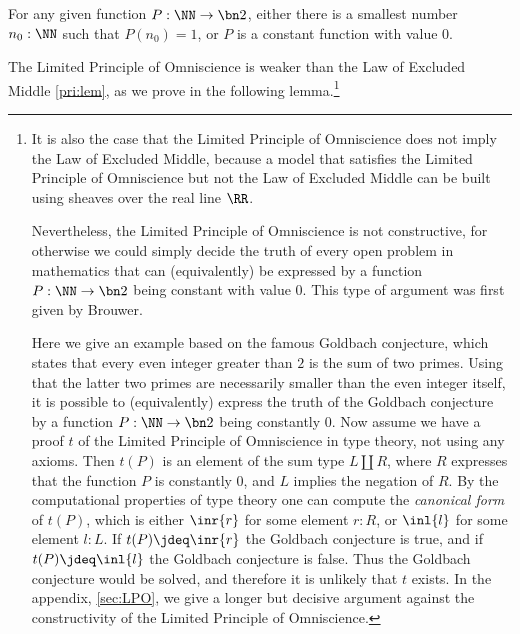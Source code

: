 \begin{principle}
  \label{LPO}%
  For any given function $P:\NN\to\bn 2$,
  either there is a smallest number $n_0:\NN$ such that $P(n_0)=1$,
  or $P$ is a constant function with value $0$.
\end{principle}


The Limited Principle of Omniscience is weaker than the Law of Excluded Middle \cref{pri:lem}, as we prove in the following lemma.\footnote{%
  It is also the case that the Limited Principle of Omniscience does not imply the Law of Excluded Middle, because
  a model that satisfies the Limited Principle of Omniscience but not the Law of Excluded Middle can be built using sheaves over the real line $\RR$.

  Nevertheless, the Limited Principle of Omniscience is not constructive,
  for otherwise we could simply decide the truth of every open problem in mathematics
  that can (equivalently) be expressed by a function $P:\NN\to\bn 2$ being constant with value $0$.
  This type of argument was first given by Brouwer. %

  Here we give an example based on the famous Goldbach conjecture,
  which states that every even integer greater than $2$ is the sum of two primes. Using that
  the latter two primes are necessarily smaller than the even integer itself, it is possible
  to (equivalently) express the truth of the Goldbach conjecture by a function $P:\NN\to\bn 2$
  being constantly $0$. Now assume we have a proof $t$ of the Limited Principle of Omniscience
  in type theory, not using any axioms. Then $t(P)$ is an element of the
  sum type $L\amalg R$, where $R$ expresses that the function $P$ is constantly $0$,
  and $L$ implies the negation of $R$.
  By the computational properties of type theory one can compute the
  \emph{canonical form} of $t(P)$, which is either $\inr{r}$ for some element $r:R$,
  or $\inl{l}$ for some element $l:L$. If $t(P)\jdeq\inr{r}$ the Goldbach conjecture is true,
  and if $t(P)\jdeq\inl{l}$ the Goldbach conjecture is false. Thus the Goldbach conjecture
  would be solved, and therefore it is unlikely that $t$ exists.
  In the appendix, \ref{sec:LPO}, we give a longer but decisive argument against the constructivity of
  the Limited Principle of Omniscience.
}


